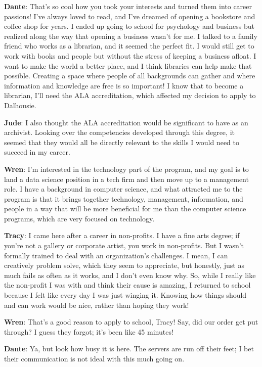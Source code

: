 \documentclass[
  letterpaper,
  DIV=11,
  numbers=noendperiod]{scrreprt}
\begin{document}
\textbf{Dante}: That's so cool how you took your interests and turned
them into career passions! I've always loved to read, and I've dreamed
of opening a bookstore and coffee shop for years. I ended up going to
school for psychology and business but realized along the way that
opening a business wasn't for me. I talked to a family friend who works
as a librarian, and it seemed the perfect fit. I would still get to work
with books and people but without the stress of keeping a business
afloat. I want to make the world a better place, and I think libraries
can help make that possible. Creating a space where people of all
backgrounds can gather and where information and knowledge are free is
so important! I know that to become a librarian, I'll need the ALA
accreditation, which affected my decision to apply to Dalhousie.

\textbf{Jude}: I also thought the ALA accreditation would be significant
to have as an archivist. Looking over the competencies developed through
this degree, it seemed that they would all be directly relevant to the
skills I would need to succeed in my career.

\textbf{Wren}: I'm interested in the technology part of the program, and
my goal is to land a data science position in a tech firm and then move
up to a management role. I have a background in computer science, and
what attracted me to the program is that it brings together technology,
management, information, and people in a way that will be more
beneficial for me than the computer science programs, which are very
focused on technology.

\textbf{Tracy}: I came here after a career in non-profits. I have a fine
arts degree; if you're not a gallery or corporate artist, you work in
non-profits. But I wasn't formally trained to deal with an
organization's challenges. I mean, I can creatively problem solve, which
they seem to appreciate, but honestly, just as much fails as often as it
works, and I don't even know why. So, while I really like the non-profit
I was with and think their cause is amazing, I returned to school
because I felt like every day I was just winging it. Knowing how things
should and can work would be nice, rather than hoping they work!

\textbf{Wren}: That's a good reason to apply to school, Tracy! Say, did
our order get put through? I guess they forgot; it's been like 45
minutes!

\textbf{Dante}: Ya, but look how busy it is here. The servers are run
off their feet; I bet their communication is not ideal with this much
going on.
\end{document}
